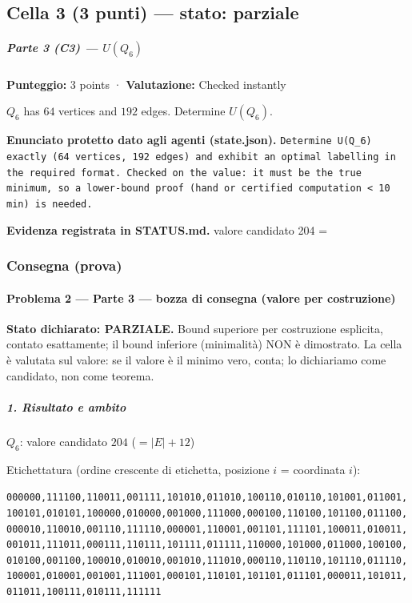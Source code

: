 \documentclass[11pt,a4paper]{article}
\begin{document}
\subsection{Cella 3 (3 punti) — stato: parziale}
\subparagraph{\texorpdfstring{Parte 3 (C3) ---
\(U(Q_6)\)}{Parte 3 (C3) --- U(Q\_6)}}\label{parte-3-c3-uq_6}

\textbf{Punteggio:} 3 points · \textbf{Valutazione:} Checked instantly

\(Q_6\) has \(64\) vertices and \(192\) edges. Determine \(U(Q_6)\).

\textbf{Enunciato protetto dato agli agenti (state.json).} \texttt{Determine U(Q\_6) exactly (64 vertices, 192 edges) and exhibit an optimal labelling in the required format. Checked on the value: it must be the true minimum, so a lower-bound proof (hand or certified computation \textless{} 10 min) is needed.}

\textbf{Evidenza registrata in STATUS.md.} valore candidato 204 =

\subsubsection{Consegna (prova)}
\paragraph{Problema 2 --- Parte 3 --- bozza di consegna (valore per
costruzione)}\label{problema-2-parte-3-bozza-di-consegna-valore-per-costruzione}

\textbf{Stato dichiarato: PARZIALE.} Bound superiore per costruzione
esplicita, contato esattamente; il bound inferiore (minimalità) NON è
dimostrato. La cella è valutata sul valore: se il valore è il minimo
vero, conta; lo dichiariamo come candidato, non come teorema.

\subparagraph{1. Risultato e ambito}\label{risultato-e-ambito}

\(Q_6\): valore candidato \(204\) (\(=|E|+12\))

Etichettatura (ordine crescente di etichetta, posizione \(i\) =
coordinata \(i\)):

\texttt{000000,111100,110011,001111,101010,011010,100110,010110,101001,011001,100101,010101,100000,010000,001000,111000,000100,110100,101100,011100,000010,110010,001110,111110,000001,110001,001101,111101,100011,010011,001011,111011,000111,110111,101111,011111,110000,101000,011000,100100,010100,001100,100010,010010,001010,111010,000110,110110,101110,011110,100001,010001,001001,111001,000101,110101,101101,011101,000011,101011,011011,100111,010111,111111}
\end{document}
